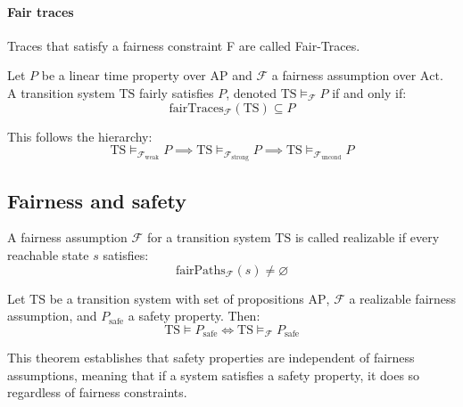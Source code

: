 \paragraph*{Fair traces}
Traces that satisfy a fairness constraint F are called Fair-Traces.
\begin{definition}
    Let $P$ be a linear time property over $\text{AP}$ and $\mathcal{F}$ a fairness assumption over $\text{Act}$. 
    A transition system $\text{TS}$ fairly satisfies $P$, denoted $\text{TS} \models_{\mathcal{F}} P$ if and only if: 
    \[\text{fairTraces}_{\mathcal{F}}(\text{TS})\subseteq P\]

\end{definition}
\noindent This follows the hierarchy: 
\[\text{TS} \models_{\mathcal{F}_{\text{weak}}} P \implies \text{TS} \models_{\mathcal{F}_{\text{strong}}} P \implies \text{TS} \models_{\mathcal{F}_{\text{uncond}}} P\]

\subsection{Fairness and safety}
\begin{definition}
    A fairness assumption $\mathcal{F}$ for a transition system $\text{TS}$ is called realizable if every reachable state $s$  satisfies:
    \[\text{fairPaths}_\mathcal{F} (s) \neq \varnothing\]
\end{definition}
\begin{theorem}
    Let $\text{TS}$ be a transition system with set of propositions $\text{AP}$, $\mathcal{F}$ a realizable fairness assumption, and $P_{\text{safe}}$ a safety property. 
    Then:
    \[\text{TS}\models P_{\text{safe}} \Leftrightarrow \text{TS}\models_{\mathcal{F}} P_{\text{safe}}\]
\end{theorem}
\noindent This theorem establishes that safety properties are independent of fairness assumptions, meaning that if a system satisfies a safety property, it does so regardless of fairness constraints.